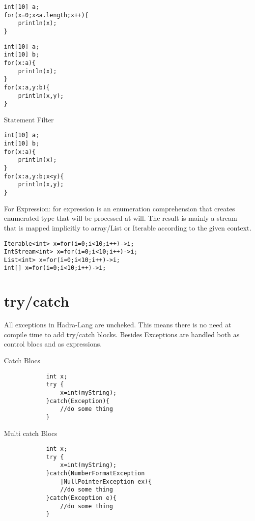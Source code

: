 \documentclass{tufte-book}
\begin{document}
            \begin{lstlisting}
int[10] a;
for(x=0;x<a.length;x++){
    println(x);
}
            \end{lstlisting}


            \begin{lstlisting}
int[10] a;
int[10] b;
for(x:a){
    println(x);
}
for(x:a,y:b){
    println(x,y);
}
            \end{lstlisting}

            Statement Filter
            \begin{lstlisting}
int[10] a;
int[10] b;
for(x:a){
    println(x);
}
for(x:a,y:b;x<y){
    println(x,y);
}
            \end{lstlisting}
            For Expression:
            for expression is an enumeration comprehension that creates enumerated type that will be processed 
            at will. The result is mainly a stream that is mapped implicitly to array/List or Iterable according 
            to the given context.
            \begin{lstlisting}
Iterable<int> x=for(i=0;i<10;i++)->i;
IntStream<int> x=for(i=0;i<10;i++)->i;
List<int> x=for(i=0;i<10;i++)->i;
int[] x=for(i=0;i<10;i++)->i;
            \end{lstlisting}


            \section{try/catch}
            All exceptions in Hadra-Lang are uncheked. This means there is no need at compile time to add try/catch blocks. Besides Exceptions are handled both as control blocs and as expressions.

            Catch Blocs
            \begin{lstlisting}
            int x;
            try {
                x=int(myString);
            }catch(Exception){
                //do some thing
            }
            \end{lstlisting}


            Multi catch Blocs
            \begin{lstlisting}
            int x;
            try {
                x=int(myString);
            }catch(NumberFormatException
                |NullPointerException ex){
                //do some thing
            }catch(Exception e){
                //do some thing
            }
            \end{lstlisting}
\end{document}
